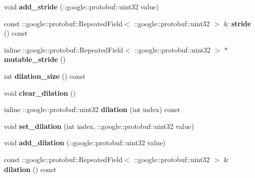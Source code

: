 \begin{DoxyCompactItemize}
void {\bfseries add\+\_\+stride} (\+::google\+::protobuf\+::uint32 value)
\item 
\mbox{\label{classcaffe_1_1_convolution_parameter_ad381307d3b9816e87f36a768c9fd9e75}} 
const \+::google\+::protobuf\+::\+Repeated\+Field$<$ \+::google\+::protobuf\+::uint32 $>$ \& {\bfseries stride} () const
\item 
\mbox{\label{classcaffe_1_1_convolution_parameter_a62803bfd6603684282c5c356f9dcffce}} 
inline \+::google\+::protobuf\+::\+Repeated\+Field$<$ \+::google\+::protobuf\+::uint32 $>$ $\ast$ {\bfseries mutable\+\_\+stride} ()
\item 
\mbox{\label{classcaffe_1_1_convolution_parameter_a9df82fad024e56bcfbada69ca6247c4f}} 
int {\bfseries dilation\+\_\+size} () const
\item 
\mbox{\label{classcaffe_1_1_convolution_parameter_a3aa1e655233b514bb0a3ae8d2eb7a2e3}} 
void {\bfseries clear\+\_\+dilation} ()
\item 
\mbox{\label{classcaffe_1_1_convolution_parameter_a41fddf8b2e981841066de41f54ac043f}} 
inline \+::google\+::protobuf\+::uint32 {\bfseries dilation} (int index) const
\item 
\mbox{\label{classcaffe_1_1_convolution_parameter_a819f4aa9ddba60f731aae1e5e4042587}} 
void {\bfseries set\+\_\+dilation} (int index, \+::google\+::protobuf\+::uint32 value)
\item 
\mbox{\label{classcaffe_1_1_convolution_parameter_ae8ad5999f4b38b5fd408aa394f51ba9f}} 
void {\bfseries add\+\_\+dilation} (\+::google\+::protobuf\+::uint32 value)
\item 
\mbox{\label{classcaffe_1_1_convolution_parameter_a4436edb3c8e595966032ffb00696584b}} 
const \+::google\+::protobuf\+::\+Repeated\+Field$<$ \+::google\+::protobuf\+::uint32 $>$ \& {\bfseries dilation} () const
\item 
\mbox{\label{classcaffe_1_1_convolution_parameter_a055fe6d22038b259c7195ece83df3143}} 

\end{DoxyCompactItemize}
